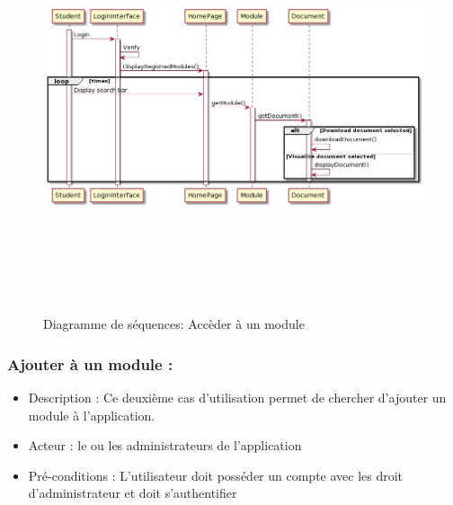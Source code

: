 \documentclass{article}
\begin{document}
{\begin{itemize}[label=\textbullet]
\end{itemize}
\vspace{5cm}
\begin{figure}[H]
\vspace{2cm}
    \includegraphics[width=16cm,height=12cm]{seqUser.jpeg}
    \caption{Diagramme de séquences: Accèder à un module}
    \label{fig:Diagramme de séquaneces: Accèder à un module.}
\end{figure}

\vspace{1cm}
\subsubsection{Ajouter à un module :}

\begin{itemize}[label=\textbullet]
        \item Description : Ce deuxième cas d'utilisation permet de chercher d'ajouter un module à l'application.
        \item Acteur : le ou les administrateurs de l'application
        \item Pré-conditions : L'utilisateur doit posséder un compte avec les droit d'administrateur et doit s'authentifier


\end{itemize}}
\end{document}
